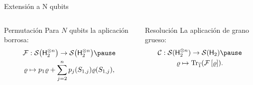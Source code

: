 \begin{frame}{Extensión a N qubits}
    \begin{columns}
        \begin{column}{0.5\textwidth}
            \begin{block}{Permutación}
            Para $N$ qubits la aplicación borrosa\pause:
            \begin{equation}
                \begin{gathered}
                \mcF:\mcS\qty( \hilbert_{2}^{\otimes n})\to \mcS\qty( \hilbert_{2}^{\otimes n})\pause\nonumber\\
                \varrho \mapsto p_{1}\varrho+\sum_{j=2}^{n}p_{j}(S_{1,j})\varrho(S_{1,j}),\nonumber
            \end{gathered}\nonumber
        \end{equation}
    \end{block}
        \end{column}
        \pause
        \begin{column}{0.5\textwidth}
            \begin{block}{Resolución}
        La aplicación de grano grueso\pause:
        \begin{equation}
            \begin{gathered}
                \mcC:\mcS( \hilbert_{2}^{\otimes n})\to \mcS(\hilbert_{2})\pause\\
                \varrho\mapsto\Tr_{\overline{1}}(\Fuzzy{\varrho}).
            \end{gathered}\nonumber
        \end{equation}
    \end{block}
        \end{column}
    \end{columns}
\end{frame}


